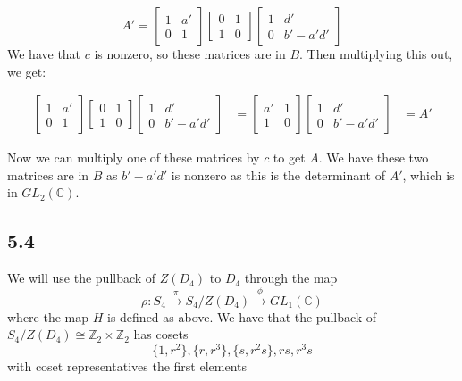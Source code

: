 \documentclass[]{article}
\begin{document}
\begin{equation}
	A' = 
	\begin{bmatrix}
		1 & a'\\
		0 & 1
	\end{bmatrix}
	\begin{bmatrix}
		0 & 1\\
		1 & 0
	\end{bmatrix}
	\begin{bmatrix}
		1 & d'\\
		0 & b' - a'd'
	\end{bmatrix}
\end{equation}
We have that $c$ is nonzero, so these matrices are in $B$. Then multiplying this out, we get:

\begin{align*}
		\begin{bmatrix}
		1 & a'\\
		0 & 1
	\end{bmatrix}
	\begin{bmatrix}
		0 & 1\\
		1 & 0
	\end{bmatrix}
	\begin{bmatrix}
		1 & d'\\
		0 & b' - a'd'
	\end{bmatrix}
&=
	\begin{bmatrix}
	a' & 1\\
	1 & 0
\end{bmatrix}
\begin{bmatrix}
	1 & d'\\
	0 & b' - a'd'
\end{bmatrix}
&= A'
\end{align*}

Now we can multiply one of these matrices by $c$ to get $A$.
We have these two matrices are in $B$ as $b' - a' d' $ is nonzero as this is the determinant of $A'$, which is in $GL_2(\mathbb{C})$. 

\subsection{5.4}
We will use the pullback of $Z(D_4)$ to $D_4$ through the map 
\begin{equation}
	\rho : S_4 \xrightarrow{\pi} S_4/Z(D_4) \xrightarrow{\phi} GL_1(\mathbb{C})
\end{equation}
where the map $H$ is defined as above.
We have that the pullback of $S_4 /Z(D_4) \cong \mathbb{Z}_2 \times \mathbb{Z}_2$ has cosets
\begin{equation}
	\{1, r^2\}, \{r, r^3\}, \{s, r^2 s\}, {rs, r^3 s}
\end{equation}
with coset representatives the first elements
\end{document}
